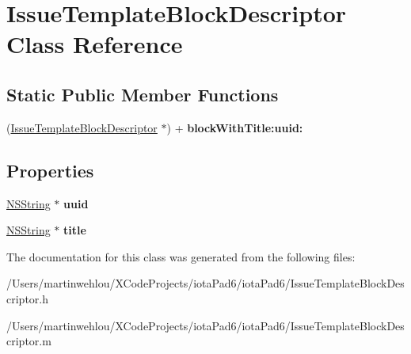 \hypertarget{interface_issue_template_block_descriptor}{
\section{IssueTemplateBlockDescriptor Class Reference}
\label{interface_issue_template_block_descriptor}
}
\subsection*{Static Public Member Functions}
\begin{DoxyCompactItemize}
\item 
\hypertarget{interface_issue_template_block_descriptor_a1677b3b8d7fb398df2abe4005313c768}{
(\hyperlink{interface_issue_template_block_descriptor}{IssueTemplateBlockDescriptor} $\ast$) + {\bfseries blockWithTitle:uuid:}}
\label{interface_issue_template_block_descriptor_a1677b3b8d7fb398df2abe4005313c768}

\end{DoxyCompactItemize}
\subsection*{Properties}
\begin{DoxyCompactItemize}
\item 
\hypertarget{interface_issue_template_block_descriptor_ab5e94b570b9ec5a957eace266e95d622}{
\hyperlink{class_n_s_string}{NSString} $\ast$ {\bfseries uuid}}
\label{interface_issue_template_block_descriptor_ab5e94b570b9ec5a957eace266e95d622}

\item 
\hypertarget{interface_issue_template_block_descriptor_afc60877ea28e9f563c475d04ead5ae17}{
\hyperlink{class_n_s_string}{NSString} $\ast$ {\bfseries title}}
\label{interface_issue_template_block_descriptor_afc60877ea28e9f563c475d04ead5ae17}

\end{DoxyCompactItemize}


The documentation for this class was generated from the following files:\begin{DoxyCompactItemize}
\item 
/Users/martinwehlou/XCodeProjects/iotaPad6/iotaPad6/IssueTemplateBlockDescriptor.h\item 
/Users/martinwehlou/XCodeProjects/iotaPad6/iotaPad6/IssueTemplateBlockDescriptor.m\end{DoxyCompactItemize}
